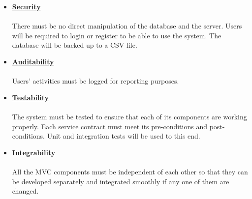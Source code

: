 \documentclass[a4paper,12pt]{article}
\begin{document}
\begin{itemize}
		\item{\bfseries \underline{Security}}\\\\
		There must be no direct manipulation of the database and the server. Users will be required to login or register to be 			able to use the system. The database will be backed up to a CSV file.
		
		\item{\bfseries \underline{Auditability}}\\\\
		Users' activities must be logged for reporting purposes.
		
		\item{\bfseries \underline{Testability}}\\\\
		The system must be tested to ensure that each of its components are working properly. Each service contract must 			meet its pre-conditions and post-conditions. Unit and integration tests will be used to this end.
		
		\item{\bfseries \underline{Integrability}}\\\\
		All the MVC components must be independent of each other so that they can be developed separately and integrated 			smoothly if any one of them are changed.
\end{itemize}

\end{document}
